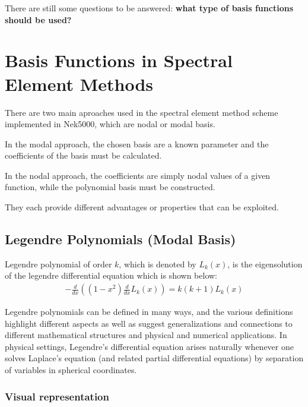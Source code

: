 \documentclass[
]{scrartcl}
\begin{document}
There are still some questions to be answered: \textbf{what type of
basis functions should be used?}

\hypertarget{basis-functions-in-spectral-element-methods}{%
\section{Basis Functions in Spectral Element
Methods}\label{basis-functions-in-spectral-element-methods}}

There are two main aproaches used in the spectral element method scheme
implemented in Nek5000, which are nodal or modal basis.

In the modal approach, the chosen basis are a known parameter and the
coefficients of the basis must be calculated.

In the nodal approach, the coefficients are simply nodal values of a
given function, while the polynomial basis must be constructed.

They each provide different advantages or properties that can be
exploited.

\hypertarget{legendre-polynomials-modal-basis}{%
\subsection{Legendre Polynomials (Modal
Basis)}\label{legendre-polynomials-modal-basis}}

Legendre polynomial of order \(k\), which is denoted by \(L_k(x)\), is
the eigensolution of the legendre differential equation which is shown
below: \begin{align}
{\displaystyle {-\frac {d}{dx}}\left(\left(1-x^{2}\right){\frac {d}{dx}L_k(x)}\right)=k(k+1)L_k(x)}
\end{align}

Legendre polynomials can be defined in many ways, and the various
definitions highlight different aspects as well as suggest
generalizations and connections to different mathematical structures and
physical and numerical applications. In physical settings, Legendre's
differential equation arises naturally whenever one solves Laplace's
equation (and related partial differential equations) by separation of
variables in spherical coordinates.

\hypertarget{visual-representation}{%
\subsubsection{Visual representation}\label{visual-representation}}
\end{document}
